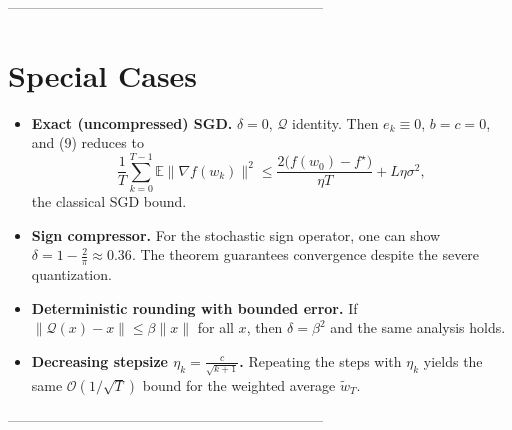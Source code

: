 \documentclass{article}
\begin{document}
--------------------------------------------------------------------

\section*{Special Cases}
\begin{itemize}
\item \textbf{Exact (uncompressed) SGD.} $\delta=0$, $\mathcal{Q}$ identity. Then $e_k\equiv0$, $b=c=0$, and (9) reduces to
\[
\frac{1}{T}\sum_{k=0}^{T-1}\mathbb{E}\|\nabla f(w_k)\|^2
\le \frac{2\big(f(w_0)-f^\star\big)}{\eta T}+L\eta\sigma^2,
\]
the classical SGD bound.

\item \textbf{Sign compressor.} For the stochastic sign operator, one can show $\delta = 1-\frac{2}{\pi}\approx0.36$. The theorem guarantees convergence despite the severe quantization.

\item \textbf{Deterministic rounding with bounded error.} If $\|\mathcal{Q}(x)-x\|\le \beta\|x\|$ for all $x$, then $\delta=\beta^2$ and the same analysis holds.

\item \textbf{Decreasing stepsize $\eta_k = \frac{c}{\sqrt{k+1}}$.} Repeating the steps with $\eta_k$ yields the same $\mathcal{O}(1/\sqrt{T})$ bound for the weighted average $\tilde w_T$.
\end{itemize}

--------------------------------------------------------------------
\end{document}
